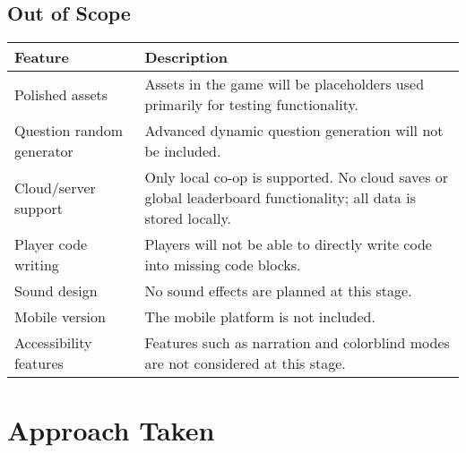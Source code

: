 \documentclass{article}
\begin{document}
\subsection*{Out of Scope}

\begin{tabularx}{\textwidth}{|l|X|}
\hline
\textbf{Feature} & \textbf{Description} \\
\hline
Polished assets & Assets in the game will be placeholders used primarily for testing functionality. \\
\hline
Question random generator & Advanced dynamic question generation will not be included. \\
\hline
Cloud/server support & Only local co-op is supported. No cloud saves or global leaderboard functionality; all data is stored locally. \\
\hline
Player code writing & Players will not be able to directly write code into missing code blocks. \\
\hline
Sound design & No sound effects are planned at this stage. \\
\hline
Mobile version & The mobile platform is not included. \\
\hline
Accessibility features & Features such as narration and colorblind modes are not considered at this stage. \\
\hline
\end{tabularx}

\section{Approach Taken}
\end{document}
